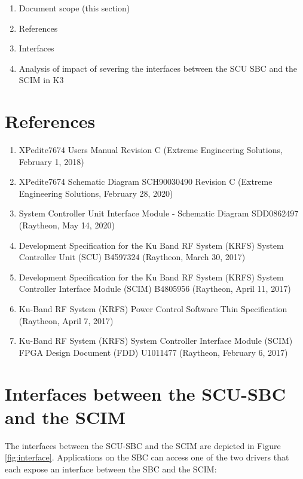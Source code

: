 \documentclass[12pt]{article}
\begin{document}
\begin{enumerate}
    \item Document scope (this section)
    \item References
    \item Interfaces
    \item Analysis of impact of severing the interfaces between the SCU
    SBC and the SCIM in K3
\end{enumerate}



\section{References}

\begin{enumerate}
    \item XPedite7674 Users Manual Revision C (Extreme Engineering Solutions, February 1, 2018) \label{ref:board_man}
    \item XPedite7674 Schematic Diagram SCH90030490 Revision C (Extreme Engineering Solutions, February 28, 2020) \label{ref:7674schematic}
    \item System Controller Unit Interface Module - Schematic Diagram SDD0862497 (Raytheon, May 14, 2020) \label{ref:scim_schematic}
    \item Development Specification for the Ku Band RF System (KRFS) System Controller Unit (SCU) B4597324 (Raytheon, March 30, 2017) \label{ref:dev_scu}
    \item Development Specification for the Ku Band RF System (KRFS) System Controller Interface Module (SCIM) B4805956 (Raytheon, April 11, 2017) \label{ref:dev_scim}
    \item Ku-Band RF System (KRFS) Power Control Software Thin Specification (Raytheon, April 7, 2017) \label{ref:power_control_sw}
    \item Ku-Band RF System (KRFS) System Controller Interface Module (SCIM) FPGA Design Document (FDD) U1011477 (Raytheon, February 6, 2017) \label{ref:scim_fdd}
\end{enumerate}


\section{Interfaces between the SCU-SBC and the SCIM}
\label{sec:interfaces}

The interfaces between the SCU-SBC and the SCIM are depicted in Figure \ref{fig:interface}.
Applications on the SBC can access one of the two drivers that each expose an interface between
the SBC and the SCIM:
\end{document}
